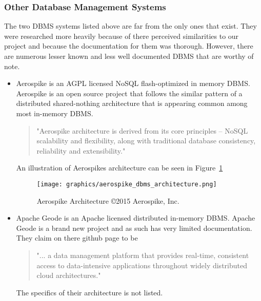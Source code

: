 \documentclass[letterpaper, 12pt]{article}
\begin{document}
\subsubsection{Other Database Management Systems}
The two DBMS systems listed above are far from the only ones that exist. They were
researched more heavily because of there perceived similarities to our project and
because the documentation for them was thorough. However, there are numerous lesser
known and less well documented DBMS that are worthy of note.

\begin{itemize}
  \par\vspace{\baselineskip}
  \item Aerospike is an AGPL licensed NoSQL flash-optimized in memory
  DBMS. Aerospike is an open source project that follows the similar pattern of
  a distributed shared-nothing architecture that is appearing common among most
  in-memory DBMS.
  \begin{quote}
  "Aerospike architecture is derived from its core principles – NoSQL scalability and
  flexibility, along with traditional database consistency, reliability and
  extensibility."
  \cite{aerospike}
  \end{quote}
  \par\vspace{\baselineskip}
  An illustration of Aerospikes architecture can be seen in Figure~\ref{fig:aerospike_architecture}
  \begin{figure}
    \centering
    \label{fig:aerospike_architecture}
    \texttt{[image: graphics/aerospike\_dbms\_architecture.png]}
    \caption{Aerospike Architecture \copyright 2015 Aerospike, Inc. \cite{aerospike}}
  \end{figure}
  \cite{aerospike}
  \par\vspace{\baselineskip}
  \item Apache Geode is an Apache licensed distributed in-memory DBMS. Apache Geode is
  a brand new project and as such has very limited documentation. They claim on there
  github page to be
  \begin{quote}
  "... a data management platform that provides real-time, consistent access to
  data-intensive applications throughout widely distributed cloud architectures."
  \cite{aerospike}
  \end{quote}
  The specifics of their architecture is not listed.
  \par\vspace{\baselineskip}

\end{itemize}
\end{document}
